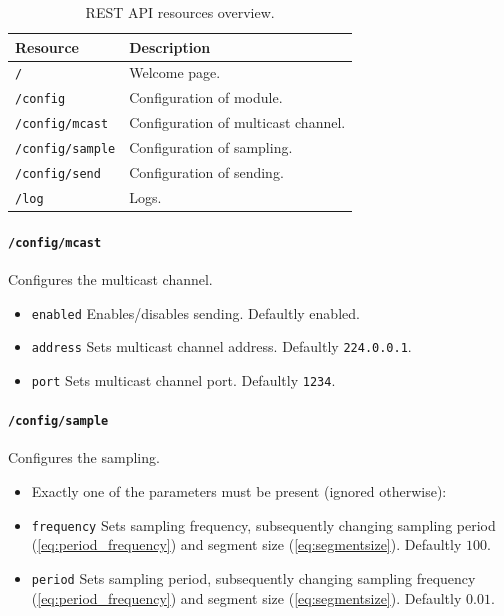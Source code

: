 \begin{table}[h!]
    \begin{tabular}{|l|l|} \hline
        \textbf{Resource} & \textbf{Description} \\ \hline
        \texttt{/} & Welcome page. \\ \hline
        \texttt{/config} & Configuration of module. \\ \hline
        \texttt{/config/mcast}  & Configuration of multicast channel. \\ \hline
        \texttt{/config/sample} & Configuration of sampling. \\ \hline
        \texttt{/config/send}   & Configuration of sending. \\ \hline
        \texttt{/log}         & Logs. \\ \hline
    \end{tabular}
    \caption{REST API resources overview.}
\end{table}

\paragraph{\texttt{/config/mcast}}
Configures the multicast channel.
\begin{itemize}
    \item[] \texttt{enabled} Enables/disables sending. Defaultly enabled.
    \item[] \texttt{address} Sets multicast channel address. Defaultly \texttt{224.0.0.1}.
    \item[] \texttt{port}    Sets multicast channel port. Defaultly \texttt{1234}.
\end{itemize}

\paragraph{\texttt{/config/sample}}
Configures the sampling.
\begin{itemize}
    \item[] Exactly one of the parameters must be present (ignored otherwise):
    \item[] \texttt{frequency} Sets sampling frequency, subsequently changing sampling period (\ref{eq:period_frequency}) and segment size (\ref{eq:segmentsize}). Defaultly $100$.
    \item[] \texttt{period}    Sets sampling period, subsequently changing sampling frequency (\ref{eq:period_frequency}) and segment size (\ref{eq:segmentsize}). Defaultly $0.01$.
\end{itemize}

